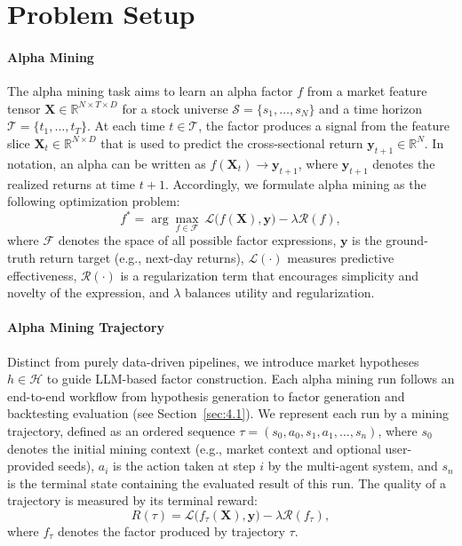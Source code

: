 \section{Problem Setup}
\paragraph{Alpha Mining}
The alpha mining task aims to learn an alpha factor $f$ from a market feature tensor $\mathbf{X}\in\mathbb{R}^{N\times T\times D}$ for a stock universe $\mathcal{S}=\{s_1,\ldots,s_N\}$ and a time horizon $\mathcal{T}=\{t_1,\ldots,t_T\}$. 
At each time $t\in\mathcal{T}$, the factor produces a signal from the feature slice $\mathbf{X}_t\in\mathbb{R}^{N\times D}$ that is used to predict the cross-sectional return $\mathbf{y}_{t+1}\in\mathbb{R}^{N}$.
In notation, an alpha can be written as $f(\mathbf{X}_t)\rightarrow \mathbf{y}_{t+1}$, where $\mathbf{y}_{t+1}$ denotes the realized returns at time $t+1$. Accordingly, we formulate alpha mining as the following optimization problem:
\begin{equation}
f^{*}=\arg\max_{f\in\mathcal{F}}\ \mathcal{L}\big(f(\mathbf{X}),\mathbf{y}\big)-\lambda\mathcal{R}(f),
\label{eq:alpha_mining}
\end{equation}
where $\mathcal{F}$ denotes the space of all possible factor expressions, $\mathbf{y}$ is the ground-truth return target (e.g., next-day returns), $\mathcal{L}(\cdot)$ measures predictive effectiveness, $\mathcal{R}(\cdot)$ is a regularization term that encourages simplicity and novelty of the expression, and $\lambda$ balances utility and regularization.
\paragraph{Alpha Mining Trajectory}
Distinct from purely data-driven pipelines, we introduce market hypotheses $h\in\mathcal{H}$ to guide LLM-based factor construction. 
Each alpha mining run follows an end-to-end workflow from hypothesis generation to factor generation and backtesting evaluation (see Section~\ref{sec:4.1}). 
We represent each run by a mining trajectory, defined as an ordered sequence $\tau=(s_0,a_0,s_1,a_1,\ldots,s_n)$, where $s_0$ denotes the initial mining context (e.g., market context and optional user-provided seeds), $a_i$ is the action taken at step $i$ by the multi-agent system, and $s_n$ is the terminal state containing the evaluated result of this run. The quality of a trajectory is measured by its terminal reward:
\begin{equation}
R(\tau)=\mathcal{L}\big(f_{\tau}(\mathbf{X}),\mathbf{y}\big)-\lambda\mathcal{R}(f_{\tau}),
\label{eq:traj_reward}
\end{equation}
where $f_{\tau}$ denotes the factor produced by trajectory $\tau$.
